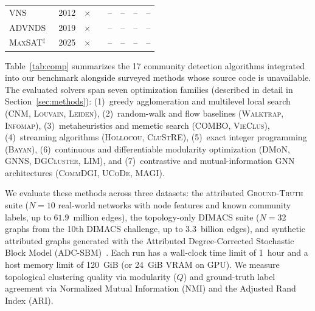 \documentclass[11pt,a4paper]{article}
\newlength{\colsep}
\begin{document}
\begin{table}[tbp]
\begin{tabular*}{\textwidth}{@{\extracolsep{\fill}}lccccccc}
        \textsc{VNS}~\cite{vns2012}                & 2012 & $\times$     &                      & --         & --         & --         & --         \\
        \textsc{ADVNDS}~\cite{advnds2019}          & 2019 & $\times$     &                      & --         & --         & --         & --         \\
        \textsc{MaxSAT}$^\ddagger$~\cite{maxsat2025} & 2025 & $\times$   &                      & --         & --         & --         & --         \\
        \bottomrule
    \end{tabular*}
\end{table}

Table~\ref{tab:comp} summarizes the 17 community detection algorithms integrated into our benchmark alongside surveyed methods whose source code is unavailable. The evaluated solvers span seven optimization families (described in detail in Section~\ref{sec:methods}): (1)~greedy agglomeration and multilevel local search (\textsc{CNM}, \textsc{Louvain}, \textsc{Leiden}), (2)~random-walk and flow baselines (\textsc{Walktrap}, \textsc{Infomap}), (3)~metaheuristics and memetic search (\textsc{COMBO}, \textsc{VieClus}), (4)~streaming algorithms (\textsc{Hollocou}, \textsc{CluStRE}), (5)~exact integer programming (\textsc{Bayan}), (6)~continuous and differentiable modularity optimization (\textsc{DMoN}, \textsc{GNNS}, \textsc{DGCluster}, \textsc{LIM}), and (7)~contrastive and mutual-information GNN architectures (\textsc{CommDGI}, \textsc{UCoDe}, \textsc{MAGI}).

We evaluate these methods across three datasets: the attributed \textsc{Ground-Truth} suite ($N=10$ real-world networks with node features and known community labels, up to $61.9$~million edges), the topology-only \textsc{DIMACS} suite ($N=32$ graphs from the 10th DIMACS challenge, up to $3.3$~billion edges), and synthetic attributed graphs generated with the Attributed Degree-Corrected Stochastic Block Model (ADC-SBM)~\cite{adcsbm2022}. Each run has a wall-clock time limit of 1~hour and a host memory limit of 120~GiB (or 24~GiB VRAM on GPU). We measure topological clustering quality via modularity ($Q$) and ground-truth label agreement via Normalized Mutual Information (NMI) and the Adjusted Rand Index (ARI).
\end{document}

